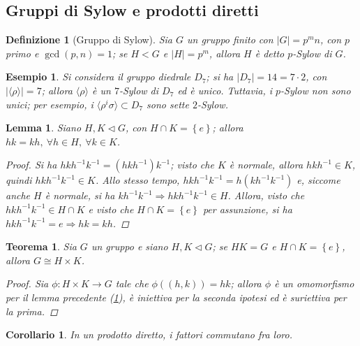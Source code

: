 \documentclass[11pt]{scrartcl}
\theoremstyle{style1}
\newtheorem{teorema}{Teorema}[section]
\newtheorem{corollario}{Corollario}[teorema]
\newtheorem{lemma}{Lemma}[teorema]
\newtheorem{definizione}{Definizione}[section]
\newtheorem{esempio}{Esempio}[section]
\numberwithin{equation}{subsection}
\begin{document}
\subsection{Gruppi di Sylow e prodotti diretti}
\begin{definizione}
	[Gruppo di Sylow]
	Sia $G$ un gruppo finito con $\lvert G \rvert = p^m n$, con $p$ primo e $\operatorname{gcd}(p,n) =1$; se $H < G$ e $\lvert H \rvert = p^m$, allora $H$ \`e detto $p$-Sylow di $G$.
\end{definizione}
\begin{esempio}
Si considera il gruppo diedrale $D_7$; si ha $\lvert D_7 \rvert = 14 = 7 \cdot 2$, con $\lvert \langle \rho  \rangle \rvert = 7$; allora $\langle \rho  \rangle$ \`e un $7$-Sylow di $D_7$ ed \`e unico.
Tuttavia, i $p$-Sylow non sono unici; per esempio, i $\langle \rho ^i \sigma \rangle\subset D_7$ sono sette $2$-Sylow.
\end{esempio}
\begin{lemma}\label{lemprec161}
	Siano $H,K\lhd G$, con $H \cap K = \left\{ e \right\} $; allora $hk = kh, \ \forall h\in H, \ \forall k \in K$.
	\begin{proof}
		Si ha $hkh^{-1}k^{-1}= (hkh^{-1})k^{-1}$; visto che $K$ \`e normale, allora $hkh^{-1}\in K$, quindi $hkh^{-1}k^{-1}\in K$.
		Allo stesso tempo, $hkh^{-1}k^{-1}= h(kh^{-1}k^{-1})$ e, siccome anche $H$ \`e normale, si ha $kh^{-1}k^{-1}\Rightarrow hkh^{-1}k^{-1}\in H$.
		Allora, visto che $hkh^{-1}k^{-1}\in H\cap K$ e visto che $H\cap K = \left\{ e \right\} $ per assunzione, si ha $hkh^{-1}k^{-1}=e \Rightarrow hk=kh$.
	\end{proof}
\end{lemma}
\begin{teorema}\label{t171}
	Sia $G$ un gruppo e siano $H,K \lhd G$; se $HK = G$ e $H\cap K = \left\{ e \right\} $, allora $G \cong H \times  K$.
	\begin{proof}
		Sia $\phi :H \times  K \to G$ tale che $\phi ((h,k))=hk$; allora $\phi $ \`e un omomorfismo per il lemma precedente (\ref{lemprec161}), \`e iniettiva per la seconda ipotesi ed \`e suriettiva per la prima.
	\end{proof}
\end{teorema}
\begin{corollario}
	In un prodotto diretto, i fattori commutano fra loro.
\end{corollario}	
\end{document}
